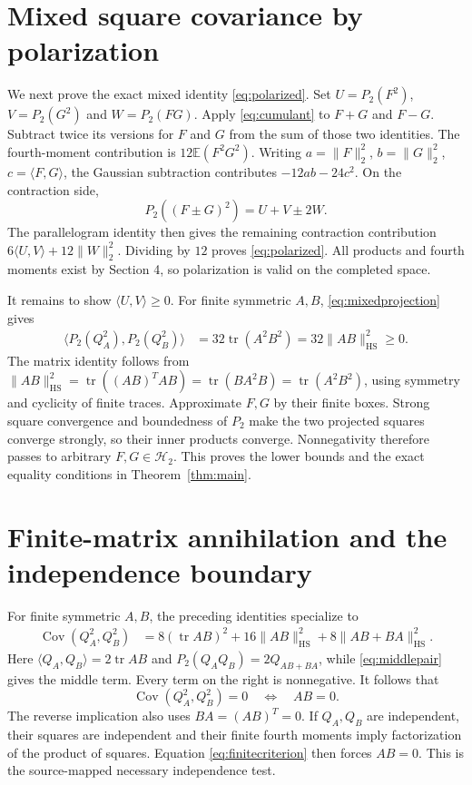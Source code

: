 \documentclass[11pt]{article}
\newcommand{\E}{\mathbb E}
\newcommand{\Hh}{\mathcal H}
\newcommand{\HS}{\mathrm{HS}}
\newcommand{\tr}{\operatorname{tr}}
\newcommand{\Cov}{\operatorname{Cov}}
\begin{document}
\section{Mixed square covariance by polarization}
We next prove the exact mixed identity \eqref{eq:polarized}.
Set $U=P_2(F^2)$, $V=P_2(G^2)$ and $W=P_2(FG)$.
Apply \eqref{eq:cumulant} to $F+G$ and $F-G$. Subtract twice
its versions for $F$ and $G$ from the sum of those two identities.
The fourth-moment contribution is $12\E(F^2G^2)$.
Writing $a=\|F\|_2^2$, $b=\|G\|_2^2$, $c=\langle F,G\rangle$,
the Gaussian subtraction contributes $-12ab-24c^2$.
On the contraction side,
\[
 P_2((F\pm G)^2)=U+V\pm2W.
\]
The parallelogram identity then gives the remaining contraction
contribution $6\langle U,V\rangle+12\|W\|_2^2$.
Dividing by $12$ proves \eqref{eq:polarized}.
All products and fourth moments exist by Section 4, so polarization
is valid on the completed space.

It remains to show $\langle U,V\rangle\geq0$.
For finite symmetric $A,B$, \eqref{eq:mixedprojection} gives
\begin{align}\label{eq:middlepair}
 \langle P_2(Q_A^2),P_2(Q_B^2)\rangle
 &=32\tr(A^2B^2)=32\|AB\|_\HS^2\geq0.
\end{align}
The matrix identity follows from
$\|AB\|_\HS^2=\tr((AB)^TAB)=\tr(BA^2B)=\tr(A^2B^2)$,
using symmetry and cyclicity of finite traces. Approximate $F,G$
by their finite boxes. Strong square convergence and boundedness
of $P_2$ make the two projected squares converge strongly, so
their inner products converge. Nonnegativity therefore passes
to arbitrary $F,G\in\Hh_2$. This proves the lower bounds and
the exact equality conditions in Theorem~\ref{thm:main}.

\section{Finite-matrix annihilation and the independence boundary}
For finite symmetric $A,B$, the preceding identities specialize to
\begin{align}\label{eq:matrixcov}
 \Cov(Q_A^2,Q_B^2)
 &=8(\tr AB)^2+16\|AB\|_\HS^2
       +8\|AB+BA\|_\HS^2.
\end{align}
Here $\langle Q_A,Q_B\rangle=2\tr AB$ and
$P_2(Q_AQ_B)=2Q_{AB+BA}$, while
\eqref{eq:middlepair} gives the middle term. Every term on the
right is nonnegative. It follows that
\begin{equation}\label{eq:finitecriterion}
 \Cov(Q_A^2,Q_B^2)=0\quad\Longleftrightarrow\quad AB=0.
\end{equation}
The reverse implication also uses $BA=(AB)^T=0$.
If $Q_A,Q_B$ are independent, their squares are independent and
their finite fourth moments imply factorization of the product of
squares. Equation \eqref{eq:finitecriterion} then forces $AB=0$.
This is the source-mapped necessary independence test.
\end{document}
